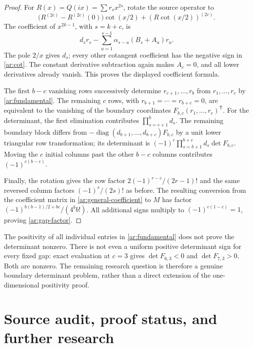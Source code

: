 \documentclass[11pt,a4paper]{article}
\numberwithin{equation}{section}
\theoremstyle{definition}
\theoremstyle{remark}
\begin{document}
\begin{proof}
For $R(x)=Q(ix)=\sum r_sx^{2s}$, rotate the source operator to
\[
 \bigl(R^{(2c)}-R^{(2c)}(0)\bigr)\cot(x/2)
        +(R\cot(x/2))^{(2c)}.
\]
The coefficient of $x^{2k-1}$, with $s=k+c$, is
\begin{equation}\label{ar:general-coefficient}
       d_sr_s-\sum_{u=1}^{s-1}\alpha_{s-u}(B_s+A_u)r_u.
\end{equation}
The pole $2/x$ gives $d_s$; every other cotangent coefficient has
the negative sign in \eqref{ar:cot}. The constant derivative
subtraction again makes $A_c=0$, and all lower derivatives already
vanish. This proves the displayed coefficient formula.

The first $b-c$ vanishing rows successively determine
$r_{c+1},\ldots,r_b$ from $r_1,\ldots,r_c$ by
\eqref{ar:fundamental}. The remaining $c$ rows, with
$r_{b+1}=\cdots=r_{b+c}=0$, are equivalent to the vanishing of
the boundary coordinates $F_{b,c}(r_1,\ldots,r_c)^{\mathsf T}$.
For the determinant, the first elimination contributes
$\prod_{s=c+1}^bd_s$. The remaining boundary block differs from
$-\operatorname{diag}(d_{b+1},\ldots,d_{b+c})F_{b,c}$ by a
unit lower triangular row transformation; its determinant is
$(-1)^c\prod_{s=b+1}^{b+c}d_s\det F_{b,c}$.
Moving the $c$ initial columns past the other $b-c$ columns contributes
$(-1)^{c(b-c)}$.

Finally, the rotation gives the row factor
$2(-1)^{r-c}/(2r-1)!$ and the same reversed column factors
$(-1)^s/(2s)!$ as before. The resulting conversion from the
coefficient matrix in \eqref{ar:general-coefficient} to $M$ has
factor $(-1)^{b(b-1)/2+bc}/(4^bb!)$. All additional signs multiply
to $(-1)^{c(1-c)}=1$, proving \eqref{ar:gap-factor}.
\end{proof}

The positivity of all individual entries in \eqref{ar:fundamental}
does not prove the determinant nonzero. There is not even a uniform
positive determinant sign for every fixed gap: exact evaluation at
$c=3$ gives $\det F_{6,3}<0$ and $\det F_{7,3}>0$. Both are nonzero.
The remaining research question is therefore a genuine boundary
determinant problem, rather than a direct extension of the one-dimensional
positivity proof.



\section{Source audit, proof status, and further research}
\label{audit:section}
\end{document}
